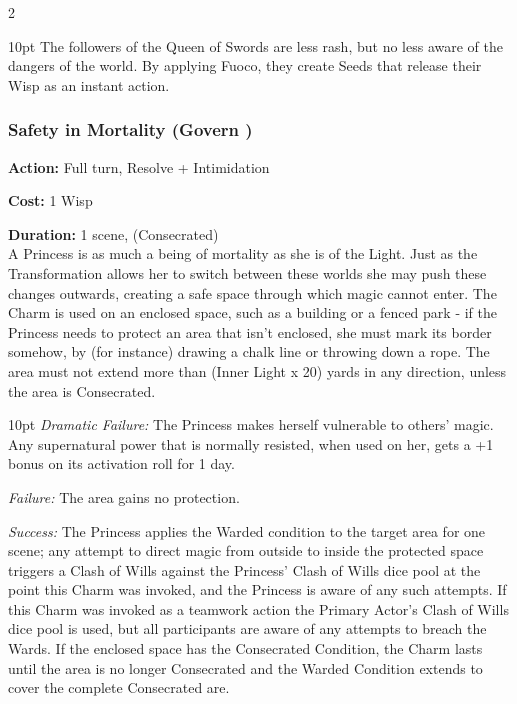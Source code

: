 \begin{multicols}{2}
\begin{myindentpar}{10pt}
The followers of the Queen of Swords are less rash, but no less aware of the dangers of the world. By applying Fuoco, they create Seeds that release their Wisp as an instant action.\end{myindentpar}

\subsubsection*{Safety in Mortality (Govern \textbullet\textbullet)}

\noindent \textbf{Action:} Full turn, Resolve + Intimidation

\noindent \textbf{Cost:} 1 Wisp

\noindent \textbf{Duration:} 1 scene, (Consecrated) \\

\noindent A Princess is as much a being of mortality as she is of the Light. Just as the Transformation allows her to switch between these worlds she may push these changes outwards, creating a safe space through which magic cannot enter. The Charm is used on an enclosed space, such as a building or a fenced park - if the Princess needs to protect an area that isn't enclosed, she must mark its border somehow, by (for instance) drawing a chalk line or throwing down a rope. The area must not extend more than (Inner Light x 20) yards in any direction, unless the area is Consecrated.

\begin{myindentpar}{10pt}    \emph{Dramatic Failure:} The Princess makes herself vulnerable to others' magic. Any supernatural power that is normally resisted, when used on her, gets a +1 bonus on its activation roll for 1 day.

    \emph{Failure:} The area gains no protection.

    \emph{Success:} The Princess applies the Warded condition to the target area for one scene; any attempt to direct magic from outside to inside the protected space triggers a Clash of Wills against the Princess' Clash of Wills dice pool at the point this Charm was invoked, and the Princess is aware of any such attempts. If this Charm was invoked as a teamwork action the Primary Actor's Clash of Wills dice pool is used, but all participants are aware of any attempts to breach the Wards. If the enclosed space has the Consecrated Condition, the Charm lasts until the area is no longer Consecrated and the Warded Condition extends to cover the complete Consecrated are.


\end{myindentpar}
\end{multicols}
